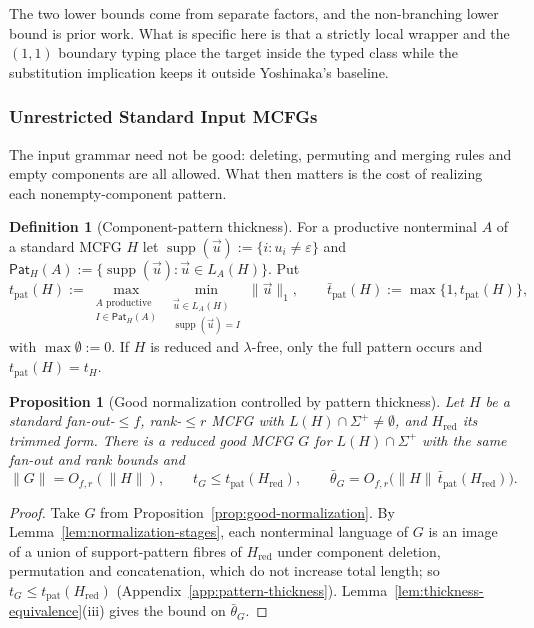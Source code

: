 \documentclass[11pt]{article}
\numberwithin{equation}{section}
\theoremstyle{plain}
\newtheorem{proposition}[theorem]{Proposition}
\theoremstyle{definition}
\newtheorem{definition}[theorem]{Definition}
\theoremstyle{remark}
\newcommand{\tuple}[1]{\vec{#1}}
\newcommand{\eps}{\varepsilon}
\theoremstyle{plain}
\begin{document}
The two lower bounds come from separate factors, and the non-branching lower bound is
prior work.  What is specific here is that a strictly local wrapper and the $(1,1)$
boundary typing place the target inside the typed class while the substitution
implication keeps it outside Yoshinaka's baseline.


\subsubsection{Unrestricted Standard Input MCFGs}
\label{subsec:unrestricted-source}

The input grammar need not be good: deleting, permuting and merging rules and
empty components are all allowed.  What then matters is the cost of realizing
each nonempty-component pattern.

\begin{definition}[Component-pattern thickness]
\label{def:component-pattern-thickness}
For a productive nonterminal $A$ of a standard MCFG $H$ let
$\operatorname{supp}(\tuple u):=\{i:u_i\ne\eps\}$ and
$\mathsf{Pat}_H(A):=\{\operatorname{supp}(\tuple u):\tuple u\in L_A(H)\}$.  Put
\[
 t_{\mathrm{pat}}(H):=
 \max_{\substack{A\text{ productive}\\I\in\mathsf{Pat}_H(A)}}
 \min_{\substack{\tuple u\in L_A(H)\\ \operatorname{supp}(\tuple u)=I}}
 \|\tuple u\|_1 ,
 \qquad
 \bar t_{\mathrm{pat}}(H):=\max\{1,t_{\mathrm{pat}}(H)\},
\]
with $\max\emptyset:=0$.  If $H$ is reduced and $\lambda$-free, only the full
pattern occurs and $t_{\mathrm{pat}}(H)=t_H$.
\end{definition}

\begin{proposition}[Good normalization controlled by pattern thickness]
\label{prop:pattern-thickness-transfer}
Let $H$ be a standard fan-out-$\le f$, rank-$\le r$ MCFG with
$L(H)\cap\Sigma^+\ne\emptyset$, and $H_{\mathrm{red}}$ its trimmed form.  There is a
reduced good MCFG $G$ for $L(H)\cap\Sigma^+$ with the same fan-out and rank
bounds and
\[
 \|G\|=O_{f,r}(\|H\|),\qquad
 t_G\le t_{\mathrm{pat}}(H_{\mathrm{red}}),\qquad
 \bar\theta_G=O_{f,r}\bigl(\|H\|\,\bar t_{\mathrm{pat}}(H_{\mathrm{red}})\bigr).
\]
\end{proposition}

\begin{proof}
Take $G$ from Proposition~\ref{prop:good-normalization}.  By
Lemma~\ref{lem:normalization-stages}, each nonterminal language of $G$ is an
image of a union of support-pattern fibres of $H_{\mathrm{red}}$ under component
deletion, permutation and concatenation, which do not increase total length;
so $t_G\le t_{\mathrm{pat}}(H_{\mathrm{red}})$
(Appendix~\ref{app:pattern-thickness}).
Lemma~\ref{lem:thickness-equivalence}(iii) gives the bound on $\bar\theta_G$.
\end{proof}
\end{document}
